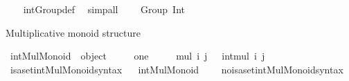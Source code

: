 \begin{isabellebody}
%
\isadelimproof
\ \ %
\endisadelimproof
%
\isatagproof
{}\isamarkupfalse%
\ int{\isacharunderscore}{\kern0pt}Group{\isacharunderscore}{\kern0pt}def\ \isamarkupfalse%
\ simp{\isacharunderscore}{\kern0pt}all%
\endisatagproof
{\isafoldproof}%
%
\isadelimproof
\isanewline
%
\endisadelimproof
\isanewline
{}\isamarkupfalse%
\ {\isachardoublequoteopen}{\isacharparenleft}{\kern0pt}{\isasymint}{\isacharcomma}{\kern0pt}\ {\isacharplus}{\kern0pt}{\isacharparenright}{\kern0pt}\ {\isacharcolon}{\kern0pt}\ Group\ Int{\isachardoublequoteclose}\isanewline
%
\isadelimproof
\isanewline
%
\endisadelimproof
%
\isatagproof
{}\isamarkupfalse%
%
\endisatagproof
{\isafoldproof}%
%
\isadelimproof
%
\endisadelimproof
%
\begin{isamarkuptext}%
Multiplicative monoid structure%
\end{isamarkuptext}\isamarkuptrue%
\isamarkupfalse%
\ {\isachardoublequoteopen}int{\isacharunderscore}{\kern0pt}Mul{\isacharunderscore}{\kern0pt}Monoid\ {\isasymequiv}\ object\ {\isacharbraceleft}{\kern0pt}\isanewline
\ \ \ \ {\isasymlangle}{\isacharat}{\kern0pt}one{\isacharcomma}{\kern0pt}\ {}{\isasymrangle}{\isacharcomma}{\kern0pt}\isanewline
\ \ \ \ {\isasymlangle}{\isacharat}{\kern0pt}mul{\isacharcomma}{\kern0pt}\ {\isasymlambda}i\ j\ {\isasymin}\ {\isasymint}{\isachardot}{\kern0pt}\ int{\isacharunderscore}{\kern0pt}mul\ i\ j{\isasymrangle}\isanewline
\ \ {\isacharbraceright}{\kern0pt}{\isachardoublequoteclose}\isanewline
\isanewline
{}\isamarkupfalse%
\ isa{\isacharunderscore}{\kern0pt}set{\isacharunderscore}{\kern0pt}int{\isacharunderscore}{\kern0pt}Mul{\isacharunderscore}{\kern0pt}Monoid{\isacharunderscore}{\kern0pt}syntax\isanewline
{}\ \isamarkupfalse%
\ int{\isacharunderscore}{\kern0pt}Mul{\isacharunderscore}{\kern0pt}Monoid\ {\isacharparenleft}{\kern0pt}{\isachardoublequoteopen}{\isacharprime}{\kern0pt}{\isacharparenleft}{\kern0pt}{\isasymint}{\isacharcomma}{\kern0pt}\ {\isacharasterisk}{\kern0pt}{\isacharprime}{\kern0pt}{\isacharparenright}{\kern0pt}{\isachardoublequoteclose}{\isacharparenright}{\kern0pt}\ \isamarkupfalse%
\isanewline
{}\isamarkupfalse%
\ no{\isacharunderscore}{\kern0pt}isa{\isacharunderscore}{\kern0pt}set{\isacharunderscore}{\kern0pt}int{\isacharunderscore}{\kern0pt}Mul{\isacharunderscore}{\kern0pt}Monoid{\isacharunderscore}{\kern0pt}syntax\isanewline
{}\ \isamarkupfalse%

\end{isabellebody}
